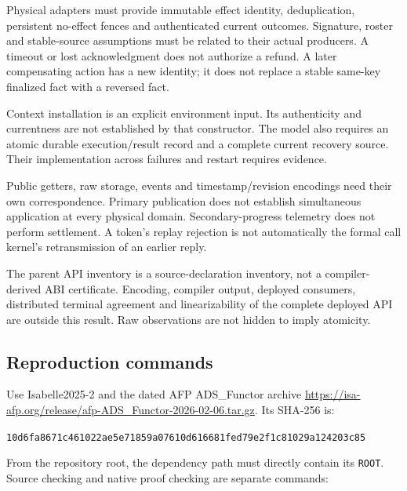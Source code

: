 \documentclass[10pt,a4paper]{article}
\newcommand{\code}[1]{\nolinkurl{#1}}
\begin{document}
\begin{description}[leftmargin=0pt,style=nextline,font=\normalfont\bfseries]
\item[Source and terminal evidence.]
Physical adapters must provide immutable effect identity, deduplication,
persistent no-effect fences and authenticated current outcomes. Signature,
roster and stable-source assumptions must be related to their actual producers.
A timeout or lost acknowledgment does not authorize a refund. A later
compensating action has a new identity; it does not replace a stable same-key
finalized fact with a reversed fact.
\item[Current policy and persistence.]
Context installation is an explicit environment input. Its authenticity and
currentness are not established by that constructor. The model also requires
an atomic durable execution/result record and a complete current recovery
source. Their implementation across failures and restart requires evidence.
\item[Observation and settlement.]
Public getters, raw storage, events and timestamp/revision encodings need their
own correspondence. Primary publication does not establish simultaneous
application at every physical domain. Secondary-progress telemetry does not
perform settlement. A token's replay rejection is not automatically the
formal call kernel's retransmission of an earlier reply.
\item[Compiled and distributed behavior.]
The parent API inventory is a source-declaration inventory, not a
compiler-derived ABI certificate. Encoding, compiler output, deployed consumers,
distributed terminal agreement and linearizability of the complete deployed
API are outside this result. Raw observations are not hidden to imply atomicity.
\end{description}

\subsection*{Reproduction commands}
Use Isabelle2025-2 and the dated AFP ADS\_Functor archive
\url{https://isa-afp.org/release/afp-ADS_Functor-2026-02-06.tar.gz}.
Its SHA-256 is:
\par{\small\code{10d6fa8671c461022ae5e71859a07610d616681fed79e2f1c81029a124203c85}}\par
From the repository root, the dependency path must directly contain its
\code{ROOT}. Source checking and native proof checking are separate commands:
\end{document}
